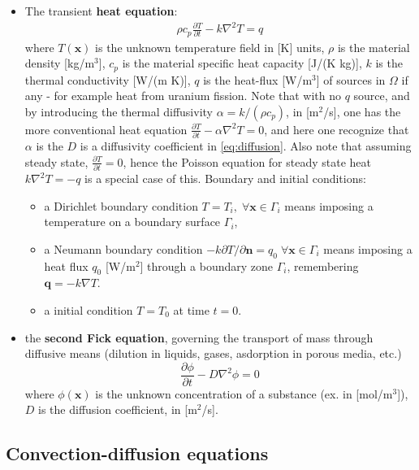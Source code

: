\documentclass{digitaldynamics}
\def\vect#1{\bm{#1}}
\begin{document}
\begin{itemize}

	\item The transient \textbf{heat equation}:
	\begin{align}
	\rho c_p \frac{\partial T}{\partial t}   - k\nabla^2 T =  q
	\label{eq:transientheat}
	\end{align}
	where $T(\vect{x})$ is the unknown temperature field in [K] units, 
	$\rho$ is the material density [kg/m${}^3$], 
	$c_p$ is the material specific heat capacity [J/(K kg)], 
	$k$ is the thermal conductivity [W/(m K)], 
	$q$ is the heat-flux [W/m${}^3$] of sources in $\Omega$ if any - for example heat from uranium fission. 
	Note that with no $q$ source, and by introducing the thermal diffusivity $\alpha=k/(\rho c_p)$, in [m${}^2$/s], one has the more conventional heat equation $\frac{\partial T}{\partial t} - \alpha \nabla^2 T=0$, and here one recognize that $\alpha$ is the $D$ is a diffusivity coefficient in \eqref{eq:diffusion}.
	Also note that assuming steady state, $\frac{\partial T}{\partial t} = 0$, hence the Poisson equation for steady state heat $k\nabla^2 T = -q$ is a special case of this.
	Boundary and initial conditions:
	\begin{itemize}
		\item a Dirichlet boundary condition $T=T_i, \; \forall \vect{x}\in\Gamma_i$ means imposing a temperature on a boundary surface $\Gamma_i$, 
		\item a Neumann   boundary condition $-k\partial{T}/\partial{\vect{n}}=q_0 \; \forall \vect{x}\in\Gamma_i$ means imposing a heat flux $q_0$ [W/m${}^2$] through a boundary zone $\Gamma_i$, remembering $\vect{q}=-k \nabla T$.
		\item a initial condition $T=T_0$ at time $t=0$.
	\end{itemize}
	
	\item the \textbf{second Fick equation}, governing the transport of mass through diffusive means (dilution in liquids, gases, asdorption in porous media, etc.)
	\[
	\frac{\partial \phi}{\partial t}   - D \nabla^2 \phi =  0
	\]
	where $\phi(\vect{x})$ is the unknown concentration of a substance (ex. in [mol/m${}^3$]), $D$ is the diffusion coefficient, in [m${}^2$/s].
	
\end{itemize}







\subsection{Convection-diffusion equations}
\end{document}

